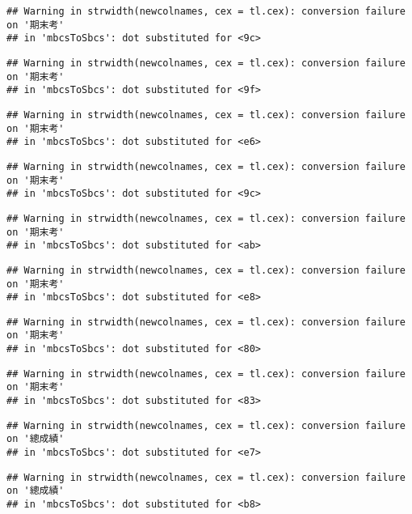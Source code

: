 \documentclass[
]{book}
\begin{document}
\begin{verbatim}
## Warning in strwidth(newcolnames, cex = tl.cex): conversion failure on '期末考'
## in 'mbcsToSbcs': dot substituted for <9c>
\end{verbatim}

\begin{verbatim}
## Warning in strwidth(newcolnames, cex = tl.cex): conversion failure on '期末考'
## in 'mbcsToSbcs': dot substituted for <9f>
\end{verbatim}

\begin{verbatim}
## Warning in strwidth(newcolnames, cex = tl.cex): conversion failure on '期末考'
## in 'mbcsToSbcs': dot substituted for <e6>
\end{verbatim}

\begin{verbatim}
## Warning in strwidth(newcolnames, cex = tl.cex): conversion failure on '期末考'
## in 'mbcsToSbcs': dot substituted for <9c>
\end{verbatim}

\begin{verbatim}
## Warning in strwidth(newcolnames, cex = tl.cex): conversion failure on '期末考'
## in 'mbcsToSbcs': dot substituted for <ab>
\end{verbatim}

\begin{verbatim}
## Warning in strwidth(newcolnames, cex = tl.cex): conversion failure on '期末考'
## in 'mbcsToSbcs': dot substituted for <e8>
\end{verbatim}

\begin{verbatim}
## Warning in strwidth(newcolnames, cex = tl.cex): conversion failure on '期末考'
## in 'mbcsToSbcs': dot substituted for <80>
\end{verbatim}

\begin{verbatim}
## Warning in strwidth(newcolnames, cex = tl.cex): conversion failure on '期末考'
## in 'mbcsToSbcs': dot substituted for <83>
\end{verbatim}

\begin{verbatim}
## Warning in strwidth(newcolnames, cex = tl.cex): conversion failure on '總成績'
## in 'mbcsToSbcs': dot substituted for <e7>
\end{verbatim}

\begin{verbatim}
## Warning in strwidth(newcolnames, cex = tl.cex): conversion failure on '總成績'
## in 'mbcsToSbcs': dot substituted for <b8>
\end{verbatim}
\end{document}
